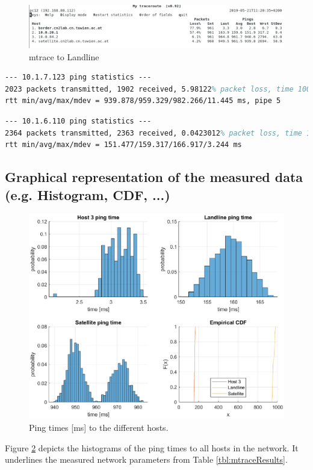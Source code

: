 \documentclass[parskip=full]{scrartcl}
\begin{document}
\begin{figure}[ht]
    \centering
   \includegraphics[width=\textwidth]{images/mytraceroute2.png} 
    \caption{mtrace to Landline}
    \label{fig:mtraceLandline}
\end{figure}


\begin{lstlisting}[language=tex, breaklines, frame=single, caption={Landline Network Parameters}, label=lst:landlineNetwork, float, floatplacement=h]
--- 10.1.7.123 ping statistics ---
2023 packets transmitted, 1902 received, 5.98122% packet loss, time 1004ms
rtt min/avg/max/mdev = 939.878/959.329/982.266/11.445 ms, pipe 5
\end{lstlisting}

\begin{lstlisting}[language=tex, breaklines, frame=single, caption={Landline Network Parameters}, label=lst:landlineNetwork, float, floatplacement=h]
--- 10.1.6.110 ping statistics ---
2364 packets transmitted, 2363 received, 0.0423012% packet loss, time 1105ms
rtt min/avg/max/mdev = 151.477/159.317/166.917/3.244 ms
\end{lstlisting}


\subsection{Graphical representation of the measured data (e.g. Histogram, CDF, ...)}
\begin{figure}
    \centering
    \includegraphics[width=1\textwidth]{dumps/ping_times.eps} 
    \caption{Ping times [ms] to the different hosts. }
    \label{fig:ping_times}
\end{figure}
Figure \ref{fig:ping_times} depicts the histograms of the ping times to all hosts in the network. 
It underlines the measured network parameters from Table \ref{tbl:mtraceResults}.
\end{document}
